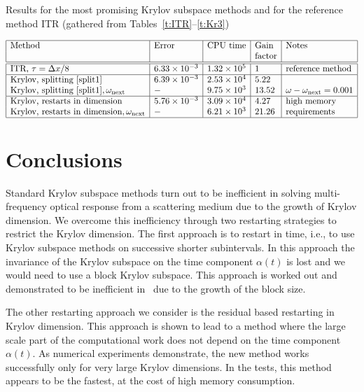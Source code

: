 \documentclass[11pt]{elsarticle}
\newcommand{\e}[1]{\times 10^{#1}}
\begin{document}
\begin{table}
\caption{Results for the most promising Krylov subspace methods 
and for the reference method ITR (gathered from 
Tables~\ref{t:ITR}--\ref{t:Kr3})}
\label{t:fin}
\[
\begin{array}{|l|l|l|l|l|} \hline
\text{Method} & \text{Error} & \text{CPU time} & \text{Gain} & \text{Notes} 
\\
              &              &                 & \text{factor} & 
\\ \hline\hline
\text{ITR, }\tau=\Delta x/8 & 6.33 \e{-3} & 1.32 \e{5} & 1 & \text{reference 
method} \\ \hline
\text{Krylov, splitting~\eqref{split1}} & 6.39 \e{-3} & 2.53 \e{4} & 5.22 &  \\ 
\text{Krylov, splitting~\eqref{split1}}, \omega_{\mathrm{next}} & - & 9.75 
\e{3} & 13.52 & \omega-\omega_{\mathrm{next}}=0.001 \\ \hline
\text{Krylov, restarts in dimension} & 5.76 \e{-3} & 3.09 \e{4} & 4.27 & 
\text{high memory} \\ 
\text{Krylov, restarts in dimension}, \omega_{\mathrm{next}} & - & 6.21 \e{3} & 
21.26 & \text{requirements} \\ \hline
\end{array}
\]
\end{table}


\section{Conclusions}
Standard Krylov subspace methods turn out to be inefficient
in solving multi-frequency optical response from a scattering medium due to the 
growth of Krylov dimension. We overcome this inefficiency through two 
restarting strategies to restrict the Krylov dimension.
The first approach is to restart in time, i.e., to use Krylov
subspace methods on successive shorter 
subintervals.  
In this approach the invariance of the Krylov subspace on the
time component $\alpha(t)$ is lost and we would need to use a block
Krylov subspace.  This approach is worked out and demonstrated to be 
inefficient in~\cite{Hanse2017_MSc} due to the growth of the block
size.  

The other restarting approach we consider is the residual based
restarting in Krylov dimension.  This approach is shown to lead
to a method where the large scale part of the computational work 
does not depend on the time component $\alpha(t)$.  As numerical 
experiments demonstrate, the new method works successfully only 
for very large Krylov dimensions.  In the tests, this method appears to
be the fastest, at the cost of high memory consumption.
\end{document}
